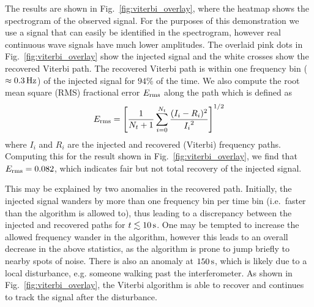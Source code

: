 \documentclass[paper-main.tex]{subfiles}
\begin{document}
The results are shown in Fig.~\ref{fig:viterbi_overlay}, where the heatmap shows the spectrogram of the observed signal. 
For the purposes of this demonstration we use a signal that can easily be identified  in the spectrogram, however real continuous wave signals have much lower amplitudes. 
The overlaid pink dots in Fig.~\ref{fig:viterbi_overlay} show the injected signal and the white crosses show the recovered Viterbi path.%
The recovered Viterbi path is within one frequency bin ($\approx 0.3\,{\rm Hz}$) of the injected signal for $94\%$ of the time. We also compute the root mean square (RMS) fractional error $E_{\rm rms}$ along the path which is defined as 
\begin{equation}
E_{\rm rms} = \left[ \frac{1}{N_t+1} \sum_{i=0}^{N_t} \frac{(I_i - R_i)^2}{{I_i}^2} \right] ^{1/2}
\end{equation}
where $I_i$ and $R_i$ are the injected and recovered (Viterbi) frequency paths. Computing this for the result shown in Fig.~\ref{fig:viterbi_overlay}, we find that $E_{\rm rms} = 0.082$, which indicates fair but not total recovery of the injected signal.


This may be explained by two anomalies in the recovered path. Initially, the injected signal wanders by more than one frequency bin per time bin (i.e.\ faster than the algorithm is allowed to), thus leading to a discrepancy between the injected and recovered paths for $t\lesssim 10\,{\rm s}$. One may be tempted to increase the allowed frequency wander in the algorithm, however this leads to an overall decrease in the above statistics, as the algorithm is prone to jump briefly to nearby spots of noise. There is also an anomaly at $150\,{\rm s}$, which is likely due to a local disturbance, e.g. someone walking past the interferometer. 
As shown in Fig.~\ref{fig:viterbi_overlay}, the Viterbi algorithm is able to recover and continues to track the signal after the disturbance. 
\end{document}
